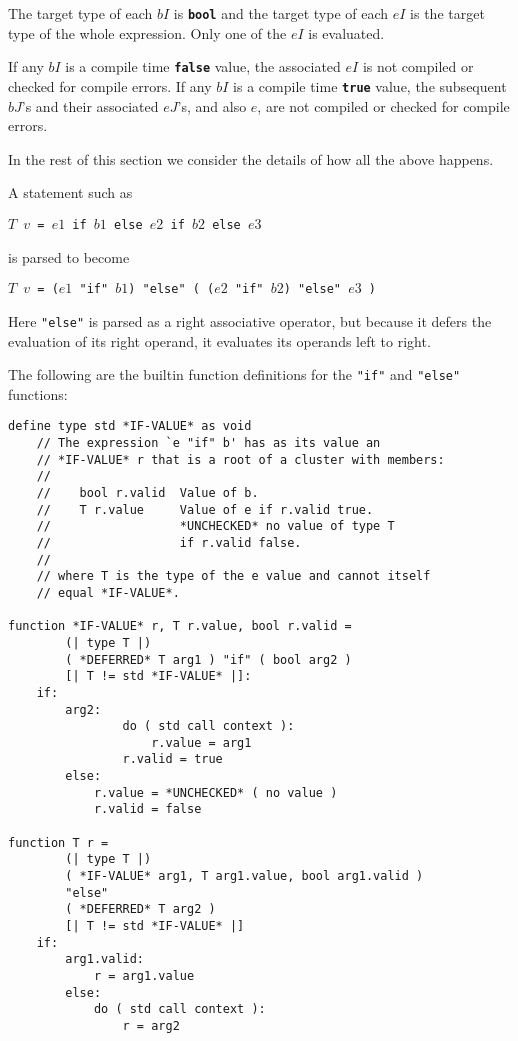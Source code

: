 \documentclass[12pt]{article}
\newcommand{\TT}[1]{{\tt \bfseries #1}}
\newenvironment{indpar}[1][0.3in]%
	{\begin{list}{}%
		     {\setlength{\itemsep}{0in}%
		      \setlength{\topsep}{0in}%
		      \setlength{\parsep}{1ex}%
		      \setlength{\labelwidth}{#1}%
		      \setlength{\leftmargin}{#1}%
		      \addtolength{\leftmargin}{\labelsep}}%
	 \item}%
	{\end{list}}
\begin{document}
The target type of each $bI$ is \TT{bool} and the target type of each
$eI$ is the target type of the whole expression.
Only one of the $eI$ is evaluated.

If any $bI$ is a compile time
\TT{false} value, the associated $eI$ is not compiled or checked
for compile errors.
If any $bI$ is a compile time
\TT{true} value, the subsequent $bJ$'s and their associated $eJ$'s,
and also $e$,
are not compiled or checked
for compile errors.

In the rest of this section we consider the details of
how all the above happens.

A statement such as
\begin{center}
\tt $T$ $v$ = $e1$ if $b1$ else $e2$ if $b2$ else $e3$
\end{center}
is parsed to become
\begin{center}
\tt $T$ $v$ = ($e1$ "if" $b1$) "else" ( ($e2$ "if" $b2$) "else" $e3$ )
\end{center}

Here {\tt "else"} is parsed as a right associative operator,
but because it defers the evaluation of its right operand,
it evaluates its operands left to right.

The following are the builtin function definitions for
the {\tt "if"} and {\tt "else" } functions:

\begin{indpar}\label{IF-ELSE-IMPLEMENTATION}\begin{verbatim}
define type std *IF-VALUE* as void
    // The expression `e "if" b' has as its value an
    // *IF-VALUE* r that is a root of a cluster with members:
    //
    //    bool r.valid  Value of b.
    //    T r.value     Value of e if r.valid true.
    //                  *UNCHECKED* no value of type T
    //                  if r.valid false.
    //
    // where T is the type of the e value and cannot itself
    // equal *IF-VALUE*.

function *IF-VALUE* r, T r.value, bool r.valid =
        (| type T |)
        ( *DEFERRED* T arg1 ) "if" ( bool arg2 )
        [| T != std *IF-VALUE* |]:
    if:
        arg2:
                do ( std call context ):
                    r.value = arg1
                r.valid = true
        else:
            r.value = *UNCHECKED* ( no value )
            r.valid = false

function T r =
        (| type T |)
        ( *IF-VALUE* arg1, T arg1.value, bool arg1.valid )
        "else"
        ( *DEFERRED* T arg2 )
        [| T != std *IF-VALUE* |]
    if:
        arg1.valid:
            r = arg1.value
        else:
            do ( std call context ):
                r = arg2
\end{verbatim}\end{indpar}
\end{document}
